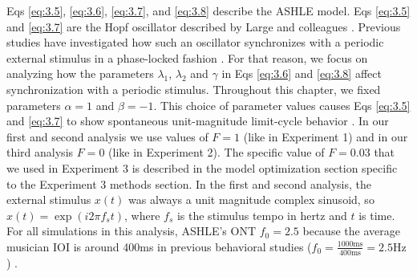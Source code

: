 \documentclass{report}
\begin{document}
Eqs \eqref{eq:3.5}, \eqref{eq:3.6}, \eqref{eq:3.7}, and \eqref{eq:3.8} describe the ASHLE model. Eqs \eqref{eq:3.5} and \eqref{eq:3.7} are the Hopf oscillator described by Large and colleagues \cite{large2010canonical}. Previous studies have investigated how such an oscillator synchronizes with a periodic external stimulus in a phase-locked fashion \cite{kim2015signal}. For that reason, we focus on analyzing how the parameters $\lambda_1$, $\lambda_2$ and $\gamma$ in Eqs \eqref{eq:3.6} and \eqref{eq:3.8} affect synchronization with a periodic stimulus. Throughout this chapter, we fixed parameters $\alpha=1$ and $\beta=-1$. This choice of parameter values causes Eqs \eqref{eq:3.5} and \eqref{eq:3.7} to show spontaneous unit-magnitude limit-cycle behavior \cite{kim2015signal}. In our first and second analysis we use values of $F = 1$ (like in Experiment 1) and in our third analysis $F = 0$ (like in Experiment 2). The specific value of $F = 0.03$ that we used in Experiment 3 is described in the model optimization section specific to the Experiment 3 methods section. In the first and second analysis, the external stimulus $x(t)$ was always a unit magnitude complex sinusoid, so $x(t) = \exp(i2\pi f_s t)$, where $f_s$ is the stimulus tempo in hertz and $t$ is time. For all simulations in this analysis, ASHLE's ONT $f_0 = 2.5$ because the average musician IOI is around 400ms in previous behavioral studies ($f_0 = \frac{1000\text{ms}}{400\text{ms}}=2.5\text{Hz}$) \cite{scheurich2018tapping, zamm2018musicians, zamm2016endogenous}.
\end{document}
